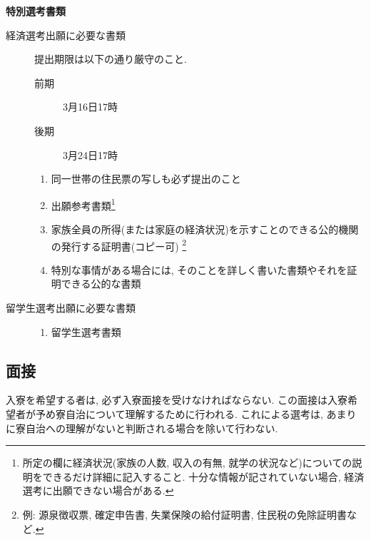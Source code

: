 \documentclass[10pt,b5jsbook,dvips,dvipdfmx,openany]{jsbook}
\theoremstyle{definition}
\begin{document}
		\begin{itembox}[l]{\bf 特別選考書類}

		\begin{description}
		\item[経済選考出願に必要な書類]

		提出期限は以下の通り厳守のこと. 
			\begin{description}
			\item[前期]3月16日17時
			\item[後期]3月24日17時
			\end{description}

			\begin{enumerate}
			\setcounter{enumi}{\value{mymemory}}
			\item 同一世帯の住民票の写しも必ず提出のこと
			\item 出願参考書類\footnote{所定の欄に経済状況(家族の人数, 収入の有無, 就学の状況など)についての説明をできるだけ詳細に記入すること. 十分な情報が記されていない場合, 経済選考に出願できない場合がある. }
			\item  家族全員の所得(または家庭の経済状況)を示すことのできる公的機関の発行する証明書(コピー可) \footnote{例: 源泉徴収票, 確定申告書, 失業保険の給付証明書, 住民税の免除証明書など. }
			\item 特別な事情がある場合には, そのことを詳しく書いた書類やそれを証明できる公的な書類 
			\setcounter{mymemory}{\value{enumi}}
			\end{enumerate}

		\item[留学生選考出願に必要な書類]

			\begin{enumerate}
			\setcounter{enumi}{\value{mymemory}}
			\item 留学生選考書類
			\end{enumerate}
		\end{description}

		\end{itembox}

		\subsection{面接}
		入寮を希望する者は, 必ず入寮面接を受けなければならない. この面接は入寮希望者が予め寮自治について理解するために行われる. これによる選考は, あまりに寮自治への理解がないと判断される場合を除いて行わない.
 
\end{document}
